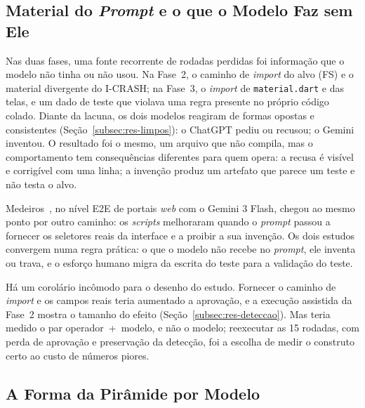 \documentclass[12pt]{article}
\begin{document}
\subsection{Material do \textit{Prompt} e o que o Modelo Faz sem Ele}
\label{subsec:disc-material}

Nas duas fases, uma fonte recorrente de rodadas perdidas foi informação que o
modelo não tinha ou não usou. Na Fase~2, o caminho de \textit{import} do
alvo (FS) e o material divergente do I-CRASH; na Fase~3, o \textit{import}
de \texttt{material.dart} e das telas, e um dado de teste que violava uma
regra presente no próprio código colado. Diante da lacuna, os dois modelos
reagiram de formas opostas e consistentes (Seção~\ref{subsec:res-limpos}):
o ChatGPT pediu ou recusou; o Gemini inventou. O resultado foi o mesmo,
um arquivo que não compila, mas o comportamento tem consequências
diferentes para quem opera: a recusa é
visível e corrigível com uma linha; a invenção produz um artefato que parece
um teste e não testa o alvo.

Medeiros~\cite{medeiros2026acessibilidade}, no nível E2E de portais
\textit{web} com o Gemini 3 Flash, chegou ao mesmo ponto por outro caminho:
os \textit{scripts} melhoraram quando o \textit{prompt} passou a fornecer os
seletores reais da interface e a proibir a sua invenção. Os dois estudos
convergem numa regra prática: o que o modelo não recebe no \textit{prompt},
ele inventa ou trava, e o esforço humano migra da escrita do teste para a
validação do teste.

Há um corolário incômodo para o desenho do estudo. Fornecer o caminho de
\textit{import} e os campos reais teria aumentado a aprovação, e a execução
assistida da Fase~2 mostra o tamanho do efeito
(Seção~\ref{subsec:res-deteccao}). Mas teria medido o par operador~+~modelo,
e não o modelo; reexecutar as 15 rodadas, com perda de aprovação e
preservação da detecção, foi a escolha de medir o construto certo ao custo de
números piores.

\subsection{A Forma da Pirâmide por Modelo}
\label{subsec:disc-piramide}
\end{document}
